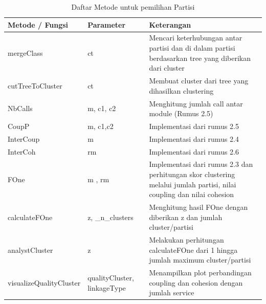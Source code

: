\begingroup
\setlength{\LTleft}{-20cm plus -1fill}
\setlength{\LTright}{\LTleft}
\begin{small}
	\begin{longtable}{|p{4cm}|p{3cm}|p{6cm}|}
		\caption{Daftar Metode untuk pemilihan Partisi}\\
		\hline
		\textbf{Metode / Fungsi} & \textbf{Parameter} & \textbf{Keterangan}\\
		\endfirsthead
		
		\hline  

		mergeClass
		& ct
		 &  Mencari keterhubungan antar partisi dan di dalam partisi berdasarkan tree yang diberikan dari cluster \\

		 \hline  

		 cutTreeToCluster
		& ct
		 & Membuat cluster dari tree yang dihasilkan clustering  \\

		 \hline  

		 NbCalls
		& m, c1, c2
		 & Menghitung jumlah call antar module (Rumus 2.5) \\

		 \hline  
		 CoupP
		 
		& m, c1,c2
		 & Implementasi dari rumus 2.5   \\

		 \hline  

		 InterCoup
		& m
		 & Implementasi dari rumus 2.4 \\

		 \hline
		
		 InterCoh
		& rm
		 & Implementasi dari rumus 2.6  \\

		 \hline
		 
		 FOne
		& m , rm
		 & Implementasi dari rumus 2.3 dan perhitungan skor clustering melalui jumlah partisi, nilai coupling dan nilai cohesion \\

		 \hline
		 calculateFOne
		& z, {\_}n{\_}clusters
		 & Menghitung hasil FOne dengan diberikan z dan jumlah cluster/partisi \\

		 \hline
		 analystCluster
		& z
		 & Melakukan perhitungan calculateFOne dari 1 hingga jumlah maximum cluster/partisi \\ 


		 \hline
		 visualizeQualityCluster
		& qualityCluster, linkageType
		 & Menampilkan plot perbandingan coupling dan cohesion dengan jumlah service  \\

		 \hline
	\end{longtable}
\end{small}
\endgroup

